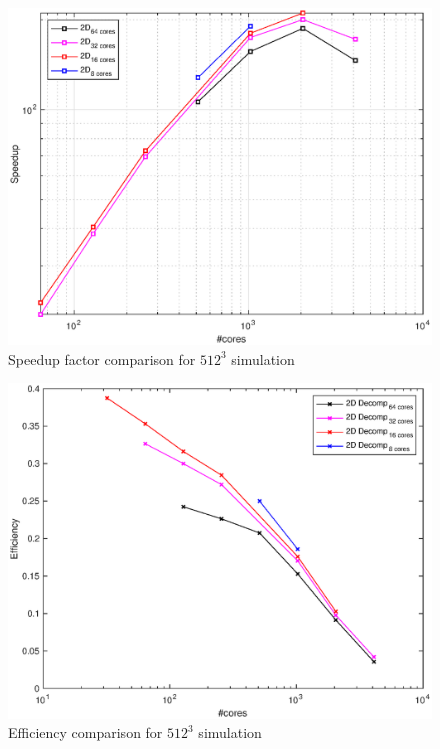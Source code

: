 \begin{figure}
\begin{center}
\includegraphics[scale=0.6]{grafici/5125}
\caption{Speedup factor comparison for $512^3$ simulation}
\label{512:perf}
\end{center}
\end{figure}

\begin{figure}
\begin{center}
\includegraphics[scale=0.6]{grafici/5126}
\caption{Efficiency comparison for $512^3$ simulation}
\label{512:eff}
\end{center}
\end{figure}